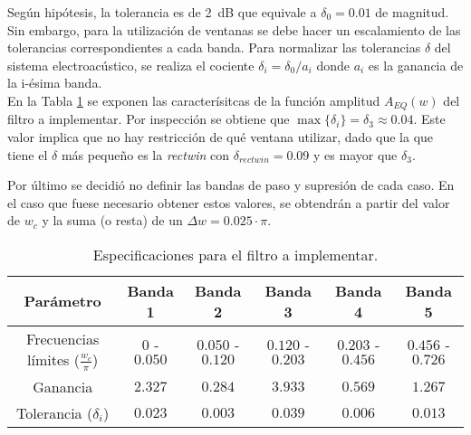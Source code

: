 
%
%
%
	
	Según hipótesis, la tolerancia es de \SI{2}{\dB} que equivale a $\delta_0 = 0.01$ de magnitud. Sin embargo, para la utilización de ventanas se debe hacer un escalamiento de las tolerancias correspondientes a cada banda. Para normalizar las tolerancias $\delta$ del sistema electroacústico, se realiza el cociente $\delta_i = \delta_0 / a_i$ donde $a_i$ es la ganancia de la i-ésima banda.\\

	En la Tabla \ref{tab:specs} se exponen las caracterísitcas de la función amplitud $A_{EQ}(w)$ del filtro a implementar. Por inspección se obtiene que $\max \{\delta_i\} = \delta_3 \approx 0.04$. Este valor implica que no hay restricción de qué ventana utilizar, dado que la que tiene el $\delta$ más pequeño es la \emph{rectwin} con $\delta_{rectwin} = 0.09$ y es mayor que $\delta_3$.

	Por último se decidió no definir las bandas de paso y supresión de cada caso. En el caso que fuese necesario obtener estos valores, se obtendrán a partir del valor de $w_c$ y la suma (o resta) de un $\Delta w = \num{0.025}\cdot\pi$.

	\begin{table}[h!]
		\centering
		\begin{tabular}{*{6}{c}}
			\toprule
			Parámetro	&	Banda 1 & Banda 2 & Banda 3 & Banda 4 & Banda 5\\
			\midrule
			Frecuencias límites ($\frac{w_c}{\pi}$)	& $0$ - $0.050$	& $0.050$ - $0.120$	& $0.120$ - $0.203$	& $0.203$ - $0.456$	& $0.456$ - $0.726$\\
			Ganancia		& $2.327$	& $0.284$	& $3.933$	& $0.569$	& $1.267$\\
			Tolerancia ($\delta_i$)	& $0.023$	& $0.003$	& $0.039$	& $0.006$	& $0.013$\\
			\bottomrule
		\end{tabular}
		\caption{Especificaciones para el filtro a implementar.}
		\label{tab:specs}
	\end{table}


